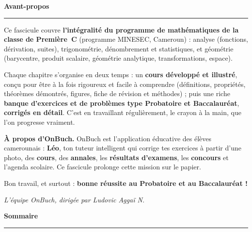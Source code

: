 





\frontmatter

\thispagestyle{empty}
\vspace*{0.6cm}
{\sffamily\fontsize{30}{32}\selectfont\bfseries\color{onbink} Avant-propos}\par\vspace{4pt}
{\color{onbo}\rule{5cm}{2.5pt}}\par\vspace{16pt}

\noindent Ce fascicule couvre \textbf{l'intégralité du programme de mathématiques de la
classe de Première~C} (programme MINESEC, Cameroun) : analyse (fonctions, dérivation,
suites), trigonométrie, dénombrement et statistiques, et géométrie (barycentre, produit
scalaire, géométrie analytique, transformations, espace).

\medskip
\noindent Chaque chapitre s'organise en deux temps : un \textbf{cours développé et
illustré}, conçu pour être à la fois rigoureux et facile à comprendre (définitions,
propriétés, théorèmes démontrés, figures, fiche de révision et méthodes) ; puis une
riche \textbf{banque d'exercices et de problèmes type Probatoire et Baccalauréat},
\textbf{corrigés en détail}. C'est en travaillant régulièrement, le crayon à la main,
que l'on progresse vraiment.

\vspace{6pt}
\begin{aretenir}
\textbf{À propos d'OnBuch.} OnBuch est l'application éducative des élèves camerounais :
\textbf{Léo}, ton tuteur intelligent qui corrige tes exercices à partir d'une photo,
des \textbf{cours}, des \textbf{annales}, les \textbf{résultats d'examens}, les
\textbf{concours} et l'agenda scolaire. Ce fascicule prolonge cette mission sur le papier.
\end{aretenir}

\medskip
\noindent Bon travail, et surtout : \textbf{bonne réussite au Probatoire et au Baccalauréat !}
\par\vspace{8pt}
\hfill{\sffamily\itshape\color{onbmuted} L'équipe OnBuch, dirigée par Ludovic Aggaï N.}
\clearpage

\thispagestyle{empty}
\vspace*{0.6cm}
{\sffamily\fontsize{30}{32}\selectfont\bfseries\color{onbink} Sommaire}\par\vspace{4pt}
{\color{onbo}\rule{5cm}{2.5pt}}\par\vspace{10pt}
{\hypersetup{linkcolor=onbink}\makeatletter{}\makeatother}

